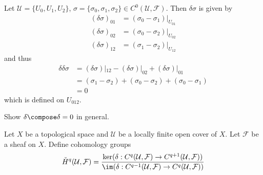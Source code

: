 \documentclass[a4paper]{article}
\begin{document}
\begin{eg}
  Let \(\mathcal U = \{U_0, U_1, U_2\}\), \(\sigma = \{\sigma_0, \sigma_1, \sigma_2\} \in C^0(\mathcal U, \mathcal F)\). Then \(\delta \sigma\) is given by
  \begin{align*}
    (\delta \sigma)_{01} &= (\sigma_0 - \sigma_1)|_{U_{01}} \\
    (\delta \sigma)_{02} &= (\sigma_0 - \sigma_2)|_{U_{02}} \\
    (\delta \sigma)_{12} &= (\sigma_1 - \sigma_2)|_{U_{12}}
  \end{align*}
  and thus
  \begin{align*}
    \delta \delta \sigma
    &= (\delta \sigma)|_{12} - (\delta \sigma)|_{02} + (\delta \sigma)|_{01} \\
    &= (\sigma_1 - \sigma_2) + (\sigma_0 - \sigma_2) + (\sigma_0 - \sigma_1) \\
    &= 0
  \end{align*}
  which is defined on \(U_{012}\).
\end{eg}

\begin{ex}
  Show \(\delta \compose \delta = 0\) in general.
\end{ex}

\begin{definition}
  Let \(X\) be a topological space and \(\mathcal U\) be a locally finite open cover of \(X\). Let \(\mathcal F\) be a sheaf on \(X\). Define cohomology groups
  \[
    \check H^q(\mathcal U, \mathcal F)
    = \frac{\ker (\delta: C^q(\mathcal U, \mathcal F) \to C^{q + 1}(\mathcal U, \mathcal F))}{\im (\delta: C^{q - 1}(\mathcal U, \mathcal F) \to C^q(\mathcal U, \mathcal F))}
  \]
\end{definition}
\end{document}
